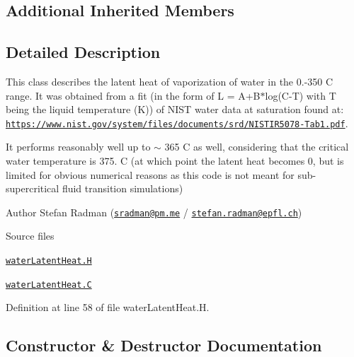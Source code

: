 \subsection*{Additional Inherited Members}


\subsection{Detailed Description}
This class describes the latent heat of vaporization of water in the 0.-\/350 C range. It was obtained from a fit (in the form of L = A+\+B$\ast$log(C-\/T) with T being the liquid temperature (K)) of N\+I\+ST water data at saturation found at\+: \href{https://www.nist.gov/system/files/documents/srd/NISTIR5078-Tab1.pdf}{\tt https\+://www.\+nist.\+gov/system/files/documents/srd/\+N\+I\+S\+T\+I\+R5078-\/\+Tab1.\+pdf}. 

\label{_Description}%
 It performs reasonably well up to $\sim$ 365 C as well, considering that the critical water temperature is 375. C (at which point the latent heat becomes 0, but is limited for obvious numerical reasons as this code is not meant for sub-\/supercritical fluid transition simulations)

Author Stefan Radman (\href{mailto:sradman@pm.me}{\tt sradman@pm.\+me} / \href{mailto:stefan.radman@epfl.ch}{\tt stefan.\+radman@epfl.\+ch})

\begin{DoxyParagraph}{Source files}

\begin{DoxyItemize}
\item \href{../../../home/carlo/data/GeN-Foam/GeN-Foam_ffn/GeN-Foam/GeN-Foam/classes/thermalHydraulics/src/physicsModels/phaseChangeModels/latentHeatModels/water/waterLatentHeat.H}{\tt water\+Latent\+Heat.\+H} 
\item \href{../../../home/carlo/data/GeN-Foam/GeN-Foam_ffn/GeN-Foam/GeN-Foam/classes/thermalHydraulics/src/physicsModels/phaseChangeModels/latentHeatModels/water/waterLatentHeat.C}{\tt water\+Latent\+Heat.\+C} 
\end{DoxyItemize}
\end{DoxyParagraph}


Definition at line 58 of file water\+Latent\+Heat.\+H.



\subsection{Constructor \& Destructor Documentation}
\mbox{\label{classFoam_1_1latentHeatModels_1_1water_a7a3a2ede223d47af06e2e4db4d181364}} 

